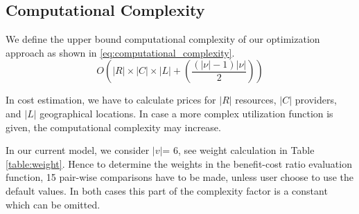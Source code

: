 \subsection{Computational Complexity}
We define the upper bound computational complexity of our optimization approach as shown in \eqref{eq:computational_complexity}.
\begin{equation} \label{eq:computational_complexity}
O\left( {\left| R \right| \times \left| C \right| \times \left| L \right| + \left( \frac{(|\nu|-1)|\nu|}{2}\right)} \right)
\end{equation}

In cost estimation, we have to calculate prices for $|R|$ resources, $|C|$ providers, and $|L|$ geographical locations. In case a more complex utilization function is given, the computational complexity may increase.

In our current model, we consider $|v|$= 6, see weight calculation in Table \ref{table:weight}. Hence to determine the weights in the benefit-cost ratio evaluation function, 15 pair-wise comparisons have to be made, unless user choose to use the default values. In both cases this part of the complexity factor is a constant which can be omitted.